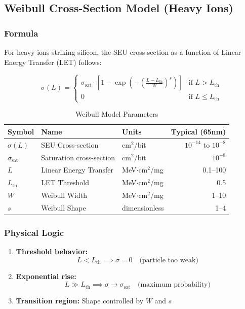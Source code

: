 \documentclass[11pt,a4paper]{article}
\begin{document}
\subsection{Weibull Cross-Section Model (Heavy Ions)}

\subsubsection{Formula}

For heavy ions striking silicon, the SEU cross-section as a function of Linear Energy Transfer (LET) follows:

\begin{equation}
\sigma(L) = \begin{cases}
\sigma_{\text{sat}} \cdot \left[1 - \exp\left(-\left(\frac{L - L_{\text{th}}}{W}\right)^s\right)\right] & \text{if } L > L_{\text{th}} \\
0 & \text{if } L \leq L_{\text{th}}
\end{cases}
\end{equation}

\begin{table}[htbp]
\centering
\caption{Weibull Model Parameters}
\begin{tabular}{@{}lllr@{}}
\toprule
\textbf{Symbol} & \textbf{Name} & \textbf{Units} & \textbf{Typical (65nm)} \\ \midrule
$\sigma(L)$ & SEU Cross-section & cm$^2$/bit & $10^{-14}$ to $10^{-8}$ \\
$\sigma_{\text{sat}}$ & Saturation cross-section & cm$^2$/bit & $10^{-8}$ \\
$L$ & Linear Energy Transfer & MeV$\cdot$cm$^2$/mg & 0.1--100 \\
$L_{\text{th}}$ & LET Threshold & MeV$\cdot$cm$^2$/mg & 0.5 \\
$W$ & Weibull Width & MeV$\cdot$cm$^2$/mg & 1--10 \\
$s$ & Weibull Shape & dimensionless & 1--4 \\ \bottomrule
\end{tabular}
\end{table}

\subsubsection{Physical Logic}

\begin{enumerate}
    \item \textbf{Threshold behavior:}
    \begin{equation}
    L < L_{\text{th}} \implies \sigma = 0 \quad \text{(particle too weak)}
    \end{equation}

    \item \textbf{Exponential rise:}
    \begin{equation}
    L \gg L_{\text{th}} \implies \sigma \to \sigma_{\text{sat}} \quad \text{(maximum probability)}
    \end{equation}

    \item \textbf{Transition region:} Shape controlled by $W$ and $s$
\end{enumerate}
\end{document}
